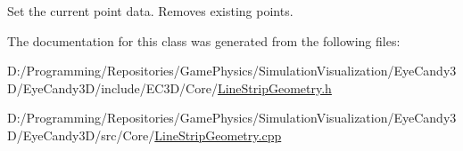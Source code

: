 Set the current point data. Removes existing points. 



The documentation for this class was generated from the following files\+:\begin{DoxyCompactItemize}
\item 
D\+:/\+Programming/\+Repositories/\+Game\+Physics/\+Simulation\+Visualization/\+Eye\+Candy3\+D/\+Eye\+Candy3\+D/include/\+E\+C3\+D/\+Core/\mbox{\hyperlink{_line_strip_geometry_8h}{Line\+Strip\+Geometry.\+h}}\item 
D\+:/\+Programming/\+Repositories/\+Game\+Physics/\+Simulation\+Visualization/\+Eye\+Candy3\+D/\+Eye\+Candy3\+D/src/\+Core/\mbox{\hyperlink{_line_strip_geometry_8cpp}{Line\+Strip\+Geometry.\+cpp}}\end{DoxyCompactItemize}
